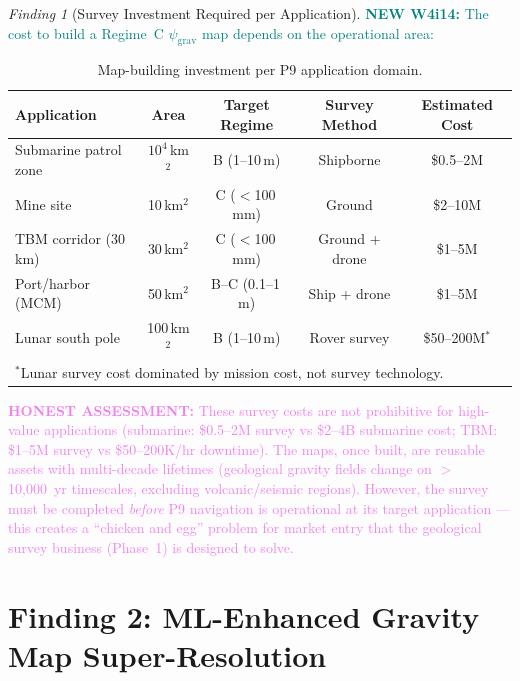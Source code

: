 \documentclass[11pt]{article}
\theoremstyle{definition}
\theoremstyle{remark}
\newtheorem{finding}[theorem]{Finding}
\newcommand{\psigrav}{\psi_{\mathrm{grav}}}
\newcommand{\honest}[1]{\textcolor{violet}{\textbf{HONEST ASSESSMENT:} #1}}
\newcommand{\newfinding}[1]{\textcolor{teal}{\textbf{NEW W4i14:} #1}}
\begin{document}
\begin{finding}[Survey Investment Required per Application]
\label{find:survey-cost}
\newfinding{The cost to build a Regime~C $\psigrav$ map depends on the
operational area:}

\begin{table}[H]
\centering
\caption{Map-building investment per P9 application domain.}
\label{tab:survey-investment}
\begin{tabular}{@{}p{3.5cm}cccc@{}}
\toprule
Application & Area & Target Regime & Survey Method & Estimated Cost \\
\midrule
Submarine patrol zone & $10^4$\,km$^2$ & B (1--10\,m) & Shipborne & \$0.5--2M \\
Mine site & 10\,km$^2$ & C ($<$100\,mm) & Ground & \$2--10M \\
TBM corridor (30\,km) & 30\,km$^2$ & C ($<$100\,mm) & Ground + drone & \$1--5M \\
Port/harbor (MCM) & 50\,km$^2$ & B--C (0.1--1\,m) & Ship + drone & \$1--5M \\
Lunar south pole & 100\,km$^2$ & B (1--10\,m) & Rover survey & \$50--200M$^*$ \\
\bottomrule
\multicolumn{5}{l}{\small $^*$Lunar survey cost dominated by mission cost, not survey technology.}
\end{tabular}
\end{table}

\honest{These survey costs are not prohibitive for high-value applications
(submarine: \$0.5--2M survey vs \$2--4B submarine cost; TBM: \$1--5M
survey vs \$50--200K/hr downtime). The maps, once built, are reusable
assets with multi-decade lifetimes (geological gravity fields change on
$>$10,000~yr timescales, excluding volcanic/seismic regions). However,
the survey must be completed \emph{before} P9 navigation is operational
at its target application --- this creates a ``chicken and egg'' problem
for market entry that the geological survey business (Phase~1) is
designed to solve.}
\end{finding}

\part{Finding 2: ML-Enhanced Gravity Map Super-Resolution}
\label{part:ml-maps}

\end{document}
